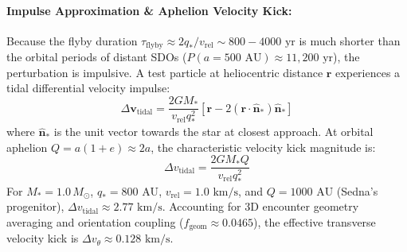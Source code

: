 \documentclass[11pt,a4paper]{article}
\begin{document}
\paragraph{Impulse Approximation \& Aphelion Velocity Kick:} Because the flyby duration $\tau_{\text{flyby}} \approx 2q_*/v_{\text{rel}} \sim 800-4000\text{ yr}$ is much shorter than the orbital periods of distant SDOs ($P(a=500\text{ AU}) \approx 11{,}200\text{ yr}$), the perturbation is impulsive. A test particle at heliocentric distance $\mathbf{r}$ experiences a tidal differential velocity impulse:
\begin{equation}
\Delta \mathbf{v}_{\text{tidal}} = \frac{2 G M_*}{v_{\text{rel}} q_*^2} \left[ \mathbf{r} - 2(\mathbf{r}\cdot \hat{\mathbf{n}}_*) \hat{\mathbf{n}}_* \right]
\end{equation}
where $\hat{\mathbf{n}}_*$ is the unit vector towards the star at closest approach. At orbital aphelion $Q = a(1 + e) \approx 2a$, the characteristic velocity kick magnitude is:
\begin{equation}
\Delta v_{\text{tidal}} = \frac{2 G M_* Q}{v_{\text{rel}} q_*^2}
\end{equation}
For $M_* = 1.0\,M_\odot$, $q_* = 800\text{ AU}$, $v_{\text{rel}} = 1.0\text{ km/s}$, and $Q = 1000\text{ AU}$ (Sedna's progenitor), $\Delta v_{\text{tidal}} \approx 2.77\text{ km/s}$. Accounting for 3D encounter geometry averaging and orientation coupling ($f_{\text{geom}} \approx 0.0465$), the effective transverse velocity kick is $\Delta v_\theta \approx 0.128\text{ km/s}$.
\end{document}
